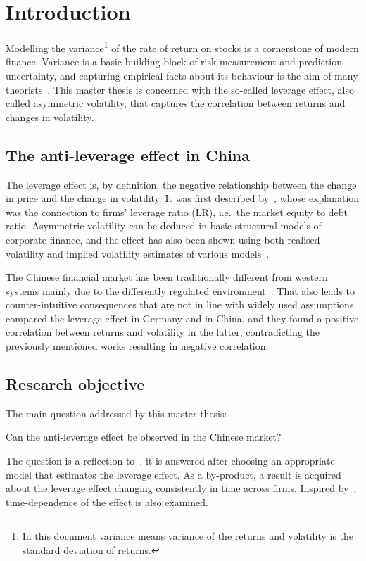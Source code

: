 \section{Introduction}

Modelling the variance\footnote{In this document variance means variance of the returns and volatility is the standard deviation of returns.} of the rate of return on stocks is a cornerstone of modern finance.
Variance is a basic building block of risk measurement and prediction uncertainty, and capturing empirical facts about its behaviour is the aim of many theorists~\citep{Christie1982}.
This master thesis is concerned with the so-called leverage effect, also called asymmetric volatility, that captures the correlation between returns and changes in volatility.

\subsection{The anti-leverage effect in China}

The leverage effect is, by definition, the negative relationship between the change in price and the change in volatility.
It was first described by~\citet{black1976studies}, whose explanation was the connection to firms' leverage ratio (LR), i.e.\ the market equity to debt ratio.
Asymmetric volatility can be deduced in basic structural models of corporate finance, and the effect has also been shown using both realised volatility and implied volatility estimates of various models~\citep{Christie1982,french1987expected,Harvey1996,Bouchaud2001}.

The Chinese financial market has been traditionally different from western systems mainly due to the differently regulated environment~\citep{GORDON2003}.
That also leads to counter-intuitive consequences that are not in line with widely used assumptions.
\citet{Shen2009} compared the leverage effect in Germany and in China, and they found a positive correlation between returns and volatility in the latter, contradicting the previously mentioned works resulting in negative correlation.


\subsection{Research objective}

The main question addressed by this master thesis:
\begin{center}
	Can the anti-leverage effect be observed in the Chinese market?
\end{center}
The question is a reflection to~\citet{Shen2009}, it is answered after choosing an appropriate model that estimates the leverage effect.
As a by-product, a result is acquired about the leverage effect changing consistently in time across firms.
Inspired by~\citet{Christensen2015}, time-dependence of the effect is also examined.
